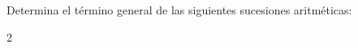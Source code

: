 Determina el término general de las siguientes sucesiones aritméticas:
                \begin{multicols}{2}
                \end{multicols}
            